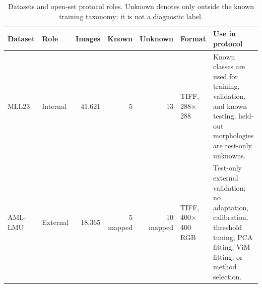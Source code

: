 \begin{table}[htbp]
\centering
\small
\begin{tabularx}{\textwidth}{l l r r r l X}
\toprule
Dataset & Role & Images & Known & Unknown & Format & Use in protocol \\
\midrule
MLL23 & Internal & 41,621 & 5 & 13 & TIFF, 288$\times$288 & Known classes are used for training, validation, and known testing; held-out morphologies are test-only unknowns. \\
AML-LMU & External & 18,365 & 5 mapped & 10 mapped & TIFF, 400$\times$400 RGB & Test-only external validation; no adaptation, calibration, threshold tuning, PCA fitting, ViM fitting, or method selection. \\
\bottomrule
\end{tabularx}
\caption{Datasets and open-set protocol roles. Unknown denotes only outside the known training taxonomy; it is not a diagnostic label.}
\label{tab:datasets}
\end{table}
